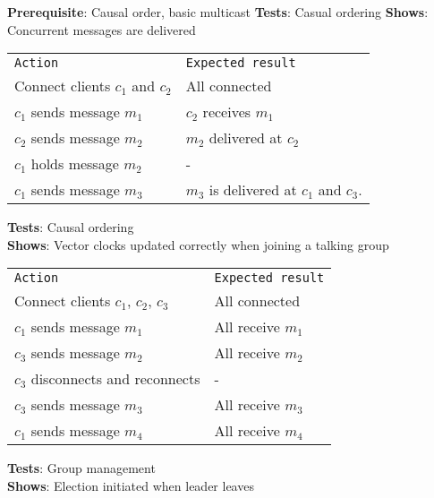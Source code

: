	\textbf{Prerequisite}: Causal order, basic multicast
	\textbf{Tests}: Casual ordering
	\textbf{Shows}: Concurrent messages are delivered

	\begin{tabular}{ll}
		\texttt{Action} & \texttt{Expected result} \\
		Connect clients $c_1$ and $c_2$ & All connected\\
		$c_1$ sends message $m_1$ & $c_2$ receives $m_1$\\
		$c_2$ sends message $m_2$ & $m_2$ delivered at $c_2$ \\
		$c_1$ holds message $m_2$ & -\\
		$c_1$ sends message $m_3$ & $m_3$ is delivered at $c_1$ and $c_3$. \\
	\end{tabular}

	\textbf{Tests}: Causal ordering \\
	\textbf{Shows}: Vector clocks updated correctly when joining a talking group\\

	\begin{tabular}{ll}
		\texttt{Action} & \texttt{Expected result} \\
		Connect clients $c_1$, $c_2$, $c_3$ & All connected\\
		$c_1$ sends message $m_1$ & All receive $m_1$\\
		$c_3$ sends message $m_2$ & All receive $m_2$ \\
		$c_3$ disconnects and reconnects & - \\
		$c_3$ sends message $m_3$ & All receive $m_3$ \\
		$c_1$ sends message $m_4$ & All receive $m_4$ \\
	\end{tabular}





	\textbf{Tests}: Group management \\
	\textbf{Shows}: Election initiated when leader leaves \\

